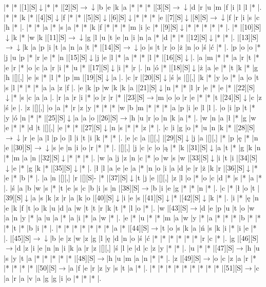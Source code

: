 \documentclass[11pt]{article}
\newcommand\drarr{$\rightarrow \!\!\!\!\! \downarrow$}
\newcommand\rarr{$\rightarrow$}
\newcommand\darr{$\downarrow$}
\begin{document}
\noindent\begin{Puzzle}{22}{30}|*	|*	|[1][S]\darr	|*	|*	|[2][S]\drarr	|b	|e	|k	|a	|*	|*	|*	|[3][S]\drarr	|d	|r	|u	|m	|f	|i	|l	|l	|*	|.
|*	|*	|k	|*	|[4][S]\darr	|f	|*	|*	|[5][S]\darr	|[6][S]\darr	|*	|*	|*	|e	|[7][S]\darr	|[8][S]\drarr	|f	|r	|i	|s	|c	|h	|*	|.
|*	|*	|a	|*	|s	|a	|*	|*	|k	|f	|*	|*	|*	|m	|i	|c	|*	|[9][S]\darr	|*	|*	|*	|*	|*	|.
|*	|[10][S]\darr	|k	|*	|w	|k	|[11][S]\drarr	|g	|l	|u	|t	|e	|n	|i	|n	|a	|*	|d	|*	|*	|[12][S]\darr	|*	|*	|.
|[13][S]\drarr	|k	|a	|p	|i	|t	|a	|n	|a	|t	|*	|[14][S]\drarr	|o	|s	|t	|r	|o	|ż	|n	|o	|ś	|ć	|*	|.
|p	|o	|o	|*	|j	|u	|p	|*	|r	|e	|*	|n	|[15][S]\darr	|j	|e	|l	|*	|a	|*	|*	|l	|*	|[16][S]\darr	|.
|a	|m	|*	|*	|a	|r	|t	|*	|e	|r	|*	|o	|c	|a	|r	|i	|*	|u	|*	|[17][S]\darr	|i	|*	|r	|.
|n	|ó	|*	|[18][S]\darr	|ż	|a	|e	|*	|t	|k	|*	|g	|h	|[][,]{ }	|e	|s	|*	|l	|*	|p	|m	|[19][S]\darr	|a	|.
|c	|r	|[20][S]\darr	|ś	|s	|[][,]{ }	|k	|*	|y	|o	|*	|a	|o	|t	|s	|l	|*	|*	|*	|a	|a	|z	|f	|.
|e	|k	|p	|w	|k	|k	|a	|[21][S]\darr	|n	|*	|*	|l	|r	|e	|*	|e	|*	|[22][S]\darr	|*	|s	|c	|a	|a	|.
|r	|a	|r	|i	|*	|o	|r	|r	|*	|[23][S]\rarr	|m	|o	|o	|r	|e	|*	|*	|t	|[24][S]\darr	|c	|z	|ś	|e	|.
|z	|[][,]{ }	|o	|a	|*	|r	|z	|y	|*	|*	|*	|w	|b	|m	|*	|*	|*	|a	|p	|i	|e	|l	|l	|.
|o	|i	|p	|t	|*	|y	|ó	|n	|*	|*	|[25][S]\darr	|a	|a	|o	|[26][S]\rarr	|h	|u	|r	|o	|n	|k	|a	|*	|.
|w	|n	|a	|ł	|*	|g	|w	|e	|*	|*	|d	|t	|[][,]{ }	|e	|*	|*	|[27][S]\darr	|n	|s	|*	|*	|z	|*	|.
|c	|i	|g	|o	|*	|u	|n	|k	|*	|[28][S]\drarr	|r	|e	|a	|l	|p	|o	|l	|i	|t	|i	|k	|*	|*	|.
|e	|c	|a	|[][,]{ }	|[29][S]\darr	|j	|a	|[][,]{ }	|*	|p	|ę	|*	|n	|e	|[30][S]\drarr	|s	|e	|n	|i	|o	|r	|*	|*	|.
|[][,]{ }	|j	|c	|c	|o	|ą	|*	|k	|[31][S]\darr	|a	|t	|*	|g	|k	|n	|*	|m	|a	|n	|[32][S]\darr	|*	|*	|*	|.
|w	|a	|j	|z	|n	|c	|*	|o	|w	|s	|w	|[33][S]\darr	|i	|t	|i	|[34][S]\darr	|e	|*	|g	|k	|*	|[35][S]\darr	|*	|.
|ł	|l	|a	|e	|e	|a	|*	|n	|o	|i	|a	|d	|e	|r	|ż	|k	|r	|[36][S]\darr	|*	|e	|*	|b	|*	|.
|a	|n	|[][,]{ }	|r	|[][S]-	|*	|[37][S]\darr	|t	|j	|e	|[][,]{ }	|z	|l	|o	|*	|o	|c	|d	|*	|s	|*	|a	|*	|.
|ś	|a	|b	|w	|s	|*	|t	|e	|s	|c	|b	|i	|s	|n	|[38][S]\rarr	|b	|i	|e	|g	|*	|*	|n	|*	|.
|c	|*	|ł	|o	|t	|[39][S]\darr	|a	|s	|k	|z	|r	|a	|k	|o	|[40][S]\darr	|i	|e	|s	|[41][S]\darr	|*	|[42][S]\darr	|k	|*	|.
|i	|*	|ę	|n	|e	|k	|f	|t	|o	|k	|u	|d	|a	|w	|t	|t	|r	|k	|t	|*	|l	|o	|*	|.
|w	|[43][S]\rarr	|d	|e	|p	|u	|t	|o	|w	|a	|n	|y	|*	|a	|u	|a	|*	|a	|i	|*	|a	|w	|*	|.
|e	|*	|u	|*	|*	|m	|a	|w	|y	|*	|a	|*	|*	|*	|b	|*	|*	|*	|t	|*	|b	|i	|*	|.
|*	|*	|*	|*	|*	|*	|*	|a	|*	|[44][S]\rarr	|t	|o	|s	|k	|a	|ń	|s	|k	|i	|*	|i	|e	|*	|.
|[45][S]\drarr	|b	|e	|z	|w	|z	|g	|l	|ę	|d	|n	|o	|ś	|ć	|*	|*	|*	|*	|*	|*	|r	|c	|*	|.
|g	|[46][S]\rarr	|d	|z	|i	|e	|n	|n	|i	|k	|a	|r	|z	|[][,]{ }	|ś	|l	|e	|d	|c	|z	|y	|*	|*	|.
|u	|*	|*	|[47][S]\rarr	|h	|u	|s	|y	|t	|a	|*	|*	|*	|*	|*	|[48][S]\rarr	|h	|u	|m	|a	|n	|*	|*	|.
|z	|[49][S]\rarr	|o	|c	|z	|a	|r	|*	|*	|*	|*	|*	|[50][S]\rarr	|a	|f	|e	|r	|z	|y	|s	|t	|a	|*	|.
|*	|*	|*	|*	|*	|*	|*	|*	|*	|[51][S]\rarr	|c	|a	|r	|a	|v	|a	|g	|g	|i	|o	|*	|*	|*	|.\end{Puzzle}
\end{document}
